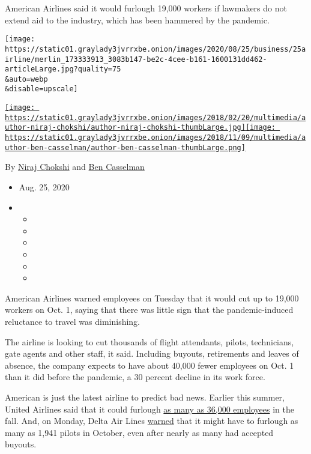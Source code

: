 American Airlines said it would furlough 19,000 workers if lawmakers do
not extend aid to the industry, which has been hammered by the pandemic.

\texttt{[image: https://static01.graylady3jvrrxbe.onion/images/2020/08/25/business/25airline/merlin\_173333913\_3083b147-be2c-4cee-b161-1600131dd462-articleLarge.jpg?quality=75\\\&auto=webp\\\&disable=upscale]}

\href{https://www.nytimes3xbfgragh.onion/by/niraj-chokshi}{\texttt{[image: https://static01.graylady3jvrrxbe.onion/images/2018/02/20/multimedia/author-niraj-chokshi/author-niraj-chokshi-thumbLarge.jpg]}}\href{https://www.nytimes3xbfgragh.onion/by/ben-casselman}{\texttt{[image: https://static01.graylady3jvrrxbe.onion/images/2018/11/09/multimedia/author-ben-casselman/author-ben-casselman-thumbLarge.png]}}

By \href{https://www.nytimes3xbfgragh.onion/by/niraj-chokshi}{Niraj
Chokshi} and
\href{https://www.nytimes3xbfgragh.onion/by/ben-casselman}{Ben
Casselman}

\begin{itemize}
\item
  Aug. 25, 2020
\item
  \begin{itemize}
  \item
  \item
  \item
  \item
  \item
  \item
  \end{itemize}
\end{itemize}

American Airlines warned employees on Tuesday that it would cut up to
19,000 workers on Oct. 1, saying that there was little sign that the
pandemic-induced reluctance to travel was diminishing.

The airline is looking to cut thousands of flight attendants, pilots,
technicians, gate agents and other staff, it said. Including buyouts,
retirements and leaves of absence, the company expects to have about
40,000 fewer employees on Oct. 1 than it did before the pandemic, a 30
percent decline in its work force.

American is just the latest airline to predict bad news. Earlier this
summer, United Airlines said that it could furlough
\href{https://www.nytimes3xbfgragh.onion/2020/07/09/business/united-airlines-says-it-could-furlough-up-to-36000-workers.html}{as
many as 36,000 employees} in the fall. And, on Monday, Delta Air Lines
\href{https://www.nytimes3xbfgragh.onion/live/2020/08/24/business/stock-market-today-coronavirus/delta-says-it-will-need-to-furlough-2000-pilots-in-october}{warned}
that it might have to furlough as many as 1,941 pilots in October, even
after nearly as many had accepted buyouts.


